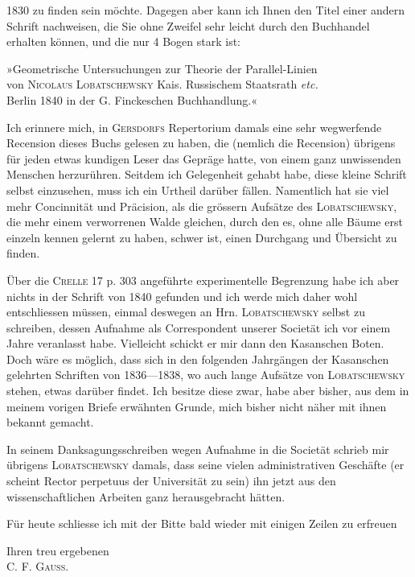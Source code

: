 %
1830 zu finden sein möchte. Dagegen aber kann ich Ihnen den Titel einer andern Schrift nachweisen, die Sie ohne Zweifel sehr leicht durch den Buchhandel erhalten können, und die nur 4 Bogen stark ist:

\begin{center}
»Geometrische Untersuchungen zur Theorie der Parallel-Linien\\
von \textsc{Nicolaus} \textsc{Lobatschewsky} Kais. Russischem Staatsrath \emph{etc.}\\
Berlin 1840 in der G. Finckeschen Buchhandlung.«
\end{center}

Ich erinnere mich, in \textsc{Gersdorfs} Repertorium damals eine sehr wegwerfende Recension dieses Buchs gelesen zu haben, die (nemlich die Recension) übrigens für jeden etwas kundigen Leser das Gepräge hatte, von einem ganz unwissenden Menschen herzurühren. Seitdem ich Gelegenheit gehabt habe, diese kleine Schrift selbst einzusehen, muss ich ein  Urtheil darüber fällen. Namentlich hat sie viel mehr Concinnität und Präcision, als die grössern Aufsätze des \textsc{Lobatschewsky}, die mehr einem verworrenen Walde gleichen, durch den es, ohne alle Bäume erst einzeln kennen gelernt zu haben, schwer ist, einen Durchgang und Übersicht zu finden.

Über die \textsc{Crelle} 17 p. 303 angeführte experimentelle Begrenzung habe ich aber nichts in der Schrift von 1840 gefunden und ich werde mich daher wohl entschliessen müssen, einmal deswegen an Hrn. \textsc{Lobatschewsky} selbst zu schreiben, dessen Aufnahme als Correspondent unserer Societät ich vor einem Jahre veranlasst habe. Vielleicht schickt er mir dann den Kasanschen Boten. Doch wäre es möglich, dass sich in den folgenden Jahrgängen der Kasanschen gelehrten Schriften von 1836---1838, wo auch lange Aufsätze von \textsc{Lobatschewsky} stehen, etwas darüber findet. Ich besitze diese zwar, habe aber bisher, aus dem in meinem vorigen Briefe erwähnten Grunde, mich bisher nicht näher mit ihnen bekannt gemacht.

In seinem Danksagungsschreiben wegen Aufnahme in die Societät schrieb mir übrigens \textsc{Lobatschewsky} damals, dass seine vielen administrativen Geschäfte (er scheint Rector perpetuus der Universität zu sein) ihn jetzt aus den wissenschaftlichen Arbeiten ganz herausgebracht hätten.

Für heute schliesse ich mit der Bitte bald wieder mit einigen Zeilen zu erfreuen

\begin{flushright}
Ihren treu ergebenen\\
\textsc{C. F. Gauss}.
\end{flushright}

\par\bigskip
